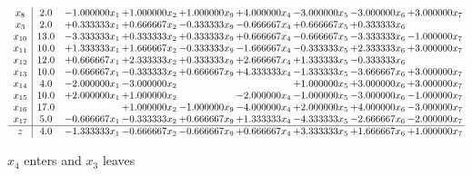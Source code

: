\documentclass[10pt]{article}
\begin{document}
 \[\begin{array}{c| c c@{\hskip 2pt} c@{\hskip 2pt} c@{\hskip 2pt} c@{\hskip 2pt} c@{\hskip 2pt} c@{\hskip 2pt} c@{\hskip 2pt} }
 x_{8}   &  2.0 & -1.000000 x_{1} & + 1.000000 x_{2} & + 1.000000 x_{9} & + 4.000000 x_{4} & -3.000000 x_{5} & -3.000000 x_{6} & + 3.000000 x_{7}\\
 x_{3}   &  2.0 & + 0.333333 x_{1} & + 0.666667 x_{2} & -0.333333 x_{9} & -0.666667 x_{4} & + 0.666667 x_{5} & + 0.333333 x_{6} &   \\
 x_{10}   &  13.0 & -3.333333 x_{1} & + 0.333333 x_{2} & + 0.333333 x_{9} & + 0.666667 x_{4} & -0.666667 x_{5} & -3.333333 x_{6} & -1.000000 x_{7}\\
 x_{11}   &  10.0 & + 1.333333 x_{1} & + 1.666667 x_{2} & -0.333333 x_{9} & -1.666667 x_{4} & -0.333333 x_{5} & + 2.333333 x_{6} & + 3.000000 x_{7}\\
 x_{12}   &  12.0 & + 0.666667 x_{1} & + 2.333333 x_{2} & + 0.333333 x_{9} & + 2.666667 x_{4} & + 1.333333 x_{5} & -0.333333 x_{6} &   \\
 x_{13}   &  10.0 & -0.666667 x_{1} & -0.333333 x_{2} & + 0.666667 x_{9} & + 4.333333 x_{4} & -1.333333 x_{5} & -3.666667 x_{6} & + 3.000000 x_{7}\\
 x_{14}   &  4.0 & -2.000000 x_{1} & -3.000000 x_{2} &    &   & + 1.000000 x_{5} & + 3.000000 x_{6} & + 3.000000 x_{7}\\
 x_{15}   &  10.0 & + 2.000000 x_{1} & + 1.000000 x_{2} &   & -2.000000 x_{4} & -1.000000 x_{5} & -3.000000 x_{6} & -1.000000 x_{7}\\
 x_{16}   &  17.0  &   & + 1.000000 x_{2} & -1.000000 x_{9} & -4.000000 x_{4} & + 2.000000 x_{5} & + 4.000000 x_{6} & -3.000000 x_{7}\\
 x_{17}   &  5.0 & -0.666667 x_{1} & -0.333333 x_{2} & + 0.666667 x_{9} & + 1.333333 x_{4} & -4.333333 x_{5} & -2.666667 x_{6} & -2.000000 x_{7}\\
\hline
z    &  4.0 & -1.333333 x_{1} & -0.666667 x_{2} & -0.666667 x_{9} & + 0.666667 x_{4} & + 3.333333 x_{5} & + 1.666667 x_{6} & + 1.000000 x_{7}\\
\end{array}\]


 $ x_{4} $ enters and $ x_{3} $ leaves 
\end{document}
